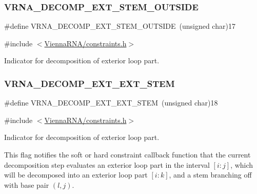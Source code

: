 \subsubsection{\texorpdfstring{V\+R\+N\+A\+\_\+\+D\+E\+C\+O\+M\+P\+\_\+\+E\+X\+T\+\_\+\+S\+T\+E\+M\+\_\+\+O\+U\+T\+S\+I\+DE}{VRNA\_DECOMP\_EXT\_STEM\_OUTSIDE}}
{\footnotesize\ttfamily \#define V\+R\+N\+A\+\_\+\+D\+E\+C\+O\+M\+P\+\_\+\+E\+X\+T\+\_\+\+S\+T\+E\+M\+\_\+\+O\+U\+T\+S\+I\+DE~(unsigned char)17}



{\ttfamily \#include $<$\mbox{\hyperlink{constraints_8h}{Vienna\+R\+N\+A/constraints.\+h}}$>$}



Indicator for decomposition of exterior loop part. 

\mbox{\label{group__constraints_ga06efd054c9271438f6d82d4559d9e69f}} 
\subsubsection{\texorpdfstring{V\+R\+N\+A\+\_\+\+D\+E\+C\+O\+M\+P\+\_\+\+E\+X\+T\+\_\+\+E\+X\+T\+\_\+\+S\+T\+EM}{VRNA\_DECOMP\_EXT\_EXT\_STEM}}
{\footnotesize\ttfamily \#define V\+R\+N\+A\+\_\+\+D\+E\+C\+O\+M\+P\+\_\+\+E\+X\+T\+\_\+\+E\+X\+T\+\_\+\+S\+T\+EM~(unsigned char)18}



{\ttfamily \#include $<$\mbox{\hyperlink{constraints_8h}{Vienna\+R\+N\+A/constraints.\+h}}$>$}



Indicator for decomposition of exterior loop part. 

This flag notifies the soft or hard constraint callback function that the current decomposition step evaluates an exterior loop part in the interval $[i:j]$, which will be decomposed into an exterior loop part $[i:k]$, and a stem branching off with base pair $(l,j)$.

